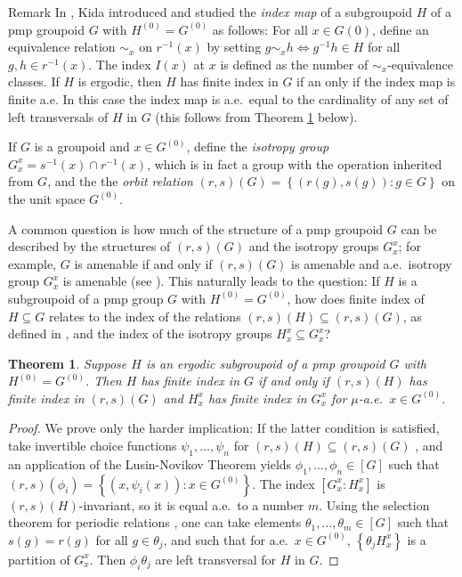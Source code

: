 \documentclass[11pt]{amsart}
\theoremstyle{plain}    \newtheorem{theorem}[generalnumbering]{Theorem}
\theoremstyle{plain}    \newtheorem{corollary}[generalnumbering]{Corollary}
\theoremstyle{definition}   \newtheorem{definition}[generalnumbering]{Definition}
\theoremstyle{definition}   \newtheorem{example}[generalnumbering]{Example}
\theoremstyle{plain}    \newtheorem{proposition}[generalnumbering]{Proposition}
\theoremstyle{plain}    \newtheorem{lemma}[generalnumbering]{Lemma}
\newcommand{\namefordifferentenvironment}{}
\theoremstyle{plain}    \newtheorem{plainstyle}[generalnumbering]{\namefordifferentenvironment}
\theoremstyle{plain}    \newtheorem*{plainstyle*}{\namefordifferentenvironment}
\theoremstyle{definition}    \newtheorem{definitionstyle}[generalnumbering]{\namefordifferentenvironment}
\theoremstyle{definition}    \newtheorem*{definitionstyle*}{\namefordifferentenvironment}
\newenvironment{denv*}[1]{\renewcommand{\namefordifferentenvironment}{#1}\begin{definitionstyle*}}{\end{definitionstyle*}}
\begin{document}
\begin{denv*}{Remark}
In \cite{MR3229595}, Kida introduced and studied the \emph{index map} of a subgroupoid $H$ of a pmp groupoid $G$ with $H^{(0)}=G^{(0)}$ as follows: For all $x\in G{(0)}$, define an equivalence relation $\sim_x$ on $r^{-1}(x)$ by setting $g\!\sim_x\! h\!\iff\! g^{-1}h\in H$ for all $g,h\in r^{-1}(x)$. The index $I(x)$ at $x$ is defined as the number of $\sim_x$-equivalence classes. If $H$ is ergodic, then $H$ has finite index in $G$ if an only if the index map is finite a.e. In this case the index map is a.e.\ equal to the cardinality of any set of left transversals of $H$ in $G$ (this follows from Theorem \ref{theoremindexgroupoidisotropyrelations} below).
\end{denv*}

If $G$ is a groupoid and $x\in G^{(0)}$, define the \emph{isotropy group} $G_x^x=s^{-1}(x)\cap r^{-1}(x)$, which is in fact a group with the operation inherited from $G$, and the the \emph{orbit relation} $(r,s)(G)=\left\{(r(g),s(g)):g\in G\right\}$ on the unit space $G^{(0)}$.

A common question is how much of the structure of a pmp groupoid $G$ can be described by the structures of $(r,s)(G)$ and the isotropy groups $G_x^x$; for example, $G$ is amenable if and only if $(r,s)(G)$ is amenable and a.e.\ isotropy group $G_x^x$ is amenable (see \cite[Theorem 4.2.7]{MR1799683}). This naturally leads to the question: If $H$ is a subgroupoid of a pmp group $G$ with $H^{(0)}=G^{(0)}$, how does finite index of $H\subseteq G$ relates to the index of the relations $(r,s)(H)\subseteq (r,s)(G)$, as defined in \cite{MR1007409}, and the index of the isotropy groups $H_x^x\subseteq G_x^x$?

\begin{theorem}\label{theoremindexgroupoidisotropyrelations}
Suppose $H$ is an ergodic subgroupoid of a pmp groupoid $G$ with $H^{(0)}=G^{(0)}$. Then $H$ has finite index in $G$ if and only if $(r,s)(H)$ has finite index in $(r,s)(G)$ and $H_x^x$ has finite index in $G_x^x$ for $\mu$-a.e.\ $x\in G^{(0)}$.
\end{theorem}
\begin{proof}
We prove only the harder implication: If the latter condition is satisfied, take invertible choice functions $\psi_1,\ldots,\psi_n$ for $(r,s)(H)\subseteq(r,s)(G)$ \cite[Lemma 1.3]{MR1007409}, and an application of the Lusin-Novikov Theorem \cite[Theorem 18.10]{MR1321597} yields $\phi_1,\ldots,\phi_n\in[G]$ such that $(r,s)(\phi_i)=\left\{(x,\psi_i(x)):x\in G^{(0)}\right\}$. The index $[G_x^x:H_x^x]$ is $(r,s)(H)$-invariant, so it is equal a.e.\ to a number $m$. Using the selection theorem for periodic relations \cite[Theorem 12.16]{MR1321597}, one can take elements $\theta_1,\ldots,\theta_m\in[G]$ such that $s(g)=r(g)$ for all $g\in\theta_j$, and such that for a.e.\ $x\in G^{(0)}$, $\left\{\theta_j H_x^x\right\}$ is a partition of $G_x^x$. Then $\phi_i\theta_j$ are left transversal for $H$ in $G$.\qedhere
\end{proof}
\end{document}
